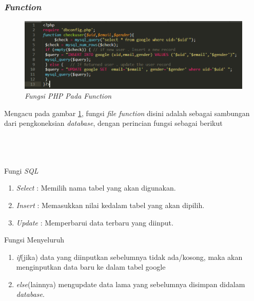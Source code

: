 \subsubsection{\textit{Function}}
\begin{figure}[!htbp]
    \centering
    \includegraphics[scale=0.5]{gambar/fungsi}
    \caption{\textit{Fungsi \textit{PHP} Pada \textit{Function}}}
    \label{fungsi}
\end{figure}
\par
Mengacu pada gambar \ref{fungsi}, fungsi \textit{file function} disini adalah sebagai sambungan dari pengkoneksian \textit{database}, dengan perincian fungsi sebagai berikut
\\
\\
\\
\\
\par
Fungi \textit{SQL}
\begin{enumerate}
\item \textit{Select} : Memilih nama tabel yang akan digunakan.
\item \textit{Insert} : Memasukkan nilai kedalam tabel yang akan dipilih.
\item \textit{Update} : Memperbarui data terbaru yang diinput.
\end{enumerate}
\par 
Fungsi Menyeluruh
\begin{enumerate}
\item \textit{if}(jika) data yang diinputkan sebelumnya tidak ada/kosong, maka akan menginputkan data baru ke dalam tabel google
\item \textit{else}(lainnya) mengupdate data lama yang sebelumnya disimpan didalam \textit{database}.
\end{enumerate}



